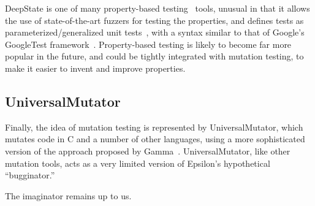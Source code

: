 \documentclass[sigplan]{acmart}
\begin{document}
DeepState is one of many property-based testing~\cite{ClaessenH00,goldstein2024property} tools, unusual in that
it allows the use of state-of-the-art fuzzers for testing the
properties, and defines tests as parameterized/generalized unit
tests~\cite{ParamUnit}, with a syntax similar to that of Google's
GoogleTest framework~\cite{GoogleTest}.  Property-based testing is
likely to become far more popular in the future, and could be tightly integrated
with mutation testing, to make it easier to invent and
improve properties.

\subsection{UniversalMutator}

Finally, the idea of mutation testing is represented by UniversalMutator, which mutates code
in C and a number of other languages, using a more sophisticated
version of the approach proposed by Gamma~\cite{SyntaxUM}.  UniversalMutator, like other
mutation tools, acts as a very limited version of Epsilon's
hypothetical 
``bugginator.''

The imaginator remains up to us.




\end{document}
